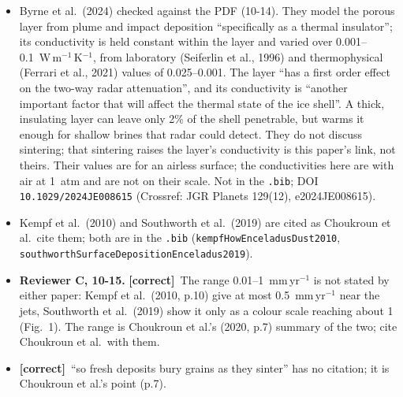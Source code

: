 \documentclass[11pt]{article}
\newcommand{\tC}{\textcolor{miss}{\textbf{[correct]}}\ }
\newcommand{\add}[1]{\textcolor{revX}{#1}}
\begin{document}
\begin{enumerate}
\begin{itemize}
    it. Choukroun's quantity is strength, and their word is ``poorly
    consolidated'', not ``unconsolidated''. Their south polar case (mean
    below 50~K) takes at least the age of the solar system to reach 1~MPa;
    equatorial noon ($>80$~K) about 100~Myr.
  \item Byrne et al.\ (2024) checked against the PDF (10-14). They model
    the porous layer from plume and impact deposition ``specifically as a
    thermal insulator''; its conductivity is held constant within the layer
    and varied over 0.001--0.1~W\,m$^{-1}$\,K$^{-1}$, from laboratory
    (Seiferlin et al., 1996) and thermophysical (Ferrari et al., 2021)
    values of 0.025--0.001. The layer ``has a first order effect on the
    two-way radar attenuation'', and its conductivity is ``another important
    factor that will affect the thermal state of the ice shell''. A thick,
    insulating layer can leave only 2\% of the shell penetrable, but warms
    it enough for shallow brines that radar could detect. They do not
    discuss sintering; that sintering raises the layer's conductivity is
    this paper's link, not theirs. Their values are for an airless surface;
    the conductivities here are with air at 1~atm and are not on their
    scale. Not in the \texttt{.bib}; DOI \texttt{10.1029/2024JE008615}
    (Crossref: JGR Planets 129(12), e2024JE008615).
  \item Kempf et al.\ (2010) and Southworth et al.\ (2019) are cited as
    Choukroun et al.\ cite them; both are in the \texttt{.bib}
    (\texttt{kempfHowEnceladusDust2010},
    \texttt{southworthSurfaceDepositionEnceladus2019}).
  \item \add{\textbf{Reviewer C, 10-15.} \tC The range 0.01--1~mm\,yr$^{-1}$
    is not stated by either paper: Kempf et al.\ (2010, p.10) give at most
    0.5~mm\,yr$^{-1}$ near the jets, Southworth et al.\ (2019) show it only
    as a colour scale reaching about 1 (Fig.~1). The range is Choukroun et
    al.'s (2020, p.7) summary of the two; cite Choukroun et al.\ with them.}
  \item \add{\tC ``so fresh deposits bury grains as they sinter'' has no
    citation; it is Choukroun et al.'s point (p.7).}

\end{itemize}
\end{enumerate}
\end{document}
